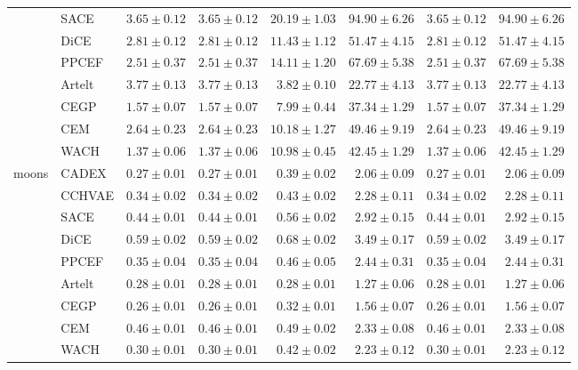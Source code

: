 \begin{table}[ht]
\begin{center}
\begin{sc}
\begin{scriptsize}
\begin{tabular}{l|l|rrrrrr}
 & SACE & $3.65\pm{0.12}$ & $3.65\pm{0.12}$ & $20.19\pm{1.03}$ & $94.90\pm{6.26}$ & $3.65\pm{0.12}$ & $94.90\pm{6.26}$ \\
 & DiCE & $2.81\pm{0.12}$ & $2.81\pm{0.12}$ & $11.43\pm{1.12}$ & $51.47\pm{4.15}$ & $2.81\pm{0.12}$ & $51.47\pm{4.15}$ \\
 & PPCEF & $2.51\pm{0.37}$ & $2.51\pm{0.37}$ & $14.11\pm{1.20}$ & $67.69\pm{5.38}$ & $2.51\pm{0.37}$ & $67.69\pm{5.38}$ \\
 & Artelt & $3.77\pm{0.13}$ & $3.77\pm{0.13}$ & $\boldsymbol{3.82\pm{0.10}}$ & $\boldsymbol{22.77\pm{4.13}}$ & $3.77\pm{0.13}$ & $\boldsymbol{22.77\pm{4.13}}$ \\
 & CEGP & $1.57\pm{0.07}$ & $1.57\pm{0.07}$ & $7.99\pm{0.44}$ & $37.34\pm{1.29}$ & $1.57\pm{0.07}$ & $37.34\pm{1.29}$ \\
 & CEM & $2.64\pm{0.23}$ & $2.64\pm{0.23}$ & $10.18\pm{1.27}$ & $49.46\pm{9.19}$ & $2.64\pm{0.23}$ & $49.46\pm{9.19}$ \\
 & WACH & $1.37\pm{0.06}$ & $1.37\pm{0.06}$ & $10.98\pm{0.45}$ & $42.45\pm{1.29}$ & $1.37\pm{0.06}$ & $42.45\pm{1.29}$ \\
\midrule
\multirow{9}{*}{moons} & CADEX & $0.27\pm{0.01}$ & $0.27\pm{0.01}$ & $0.39\pm{0.02}$ & $2.06\pm{0.09}$ & $0.27\pm{0.01}$ & $2.06\pm{0.09}$ \\
 & CCHVAE & $0.34\pm{0.02}$ & $0.34\pm{0.02}$ & $0.43\pm{0.02}$ & $2.28\pm{0.11}$ & $0.34\pm{0.02}$ & $2.28\pm{0.11}$ \\
 & SACE & $0.44\pm{0.01}$ & $0.44\pm{0.01}$ & $0.56\pm{0.02}$ & $2.92\pm{0.15}$ & $0.44\pm{0.01}$ & $2.92\pm{0.15}$ \\
 & DiCE & $0.59\pm{0.02}$ & $0.59\pm{0.02}$ & $0.68\pm{0.02}$ & $3.49\pm{0.17}$ & $0.59\pm{0.02}$ & $3.49\pm{0.17}$ \\
 & PPCEF & $0.35\pm{0.04}$ & $0.35\pm{0.04}$ & $0.46\pm{0.05}$ & $2.44\pm{0.31}$ & $0.35\pm{0.04}$ & $2.44\pm{0.31}$ \\
 & Artelt & $0.28\pm{0.01}$ & $0.28\pm{0.01}$ & $\boldsymbol{0.28\pm{0.01}}$ & $\boldsymbol{1.27\pm{0.06}}$ & $0.28\pm{0.01}$ & $\boldsymbol{1.27\pm{0.06}}$ \\
 & CEGP & $\boldsymbol{0.26\pm{0.01}}$ & $\boldsymbol{0.26\pm{0.01}}$ & $0.32\pm{0.01}$ & $1.56\pm{0.07}$ & $\boldsymbol{0.26\pm{0.01}}$ & $1.56\pm{0.07}$ \\
 & CEM & $0.46\pm{0.01}$ & $0.46\pm{0.01}$ & $0.49\pm{0.02}$ & $2.33\pm{0.08}$ & $0.46\pm{0.01}$ & $2.33\pm{0.08}$ \\
 & WACH & $0.30\pm{0.01}$ & $0.30\pm{0.01}$ & $0.42\pm{0.02}$ & $2.23\pm{0.12}$ & $0.30\pm{0.01}$ & $2.23\pm{0.12}$ \\

\end{tabular}
\end{scriptsize}
\end{sc}
\end{center}
\end{table}
